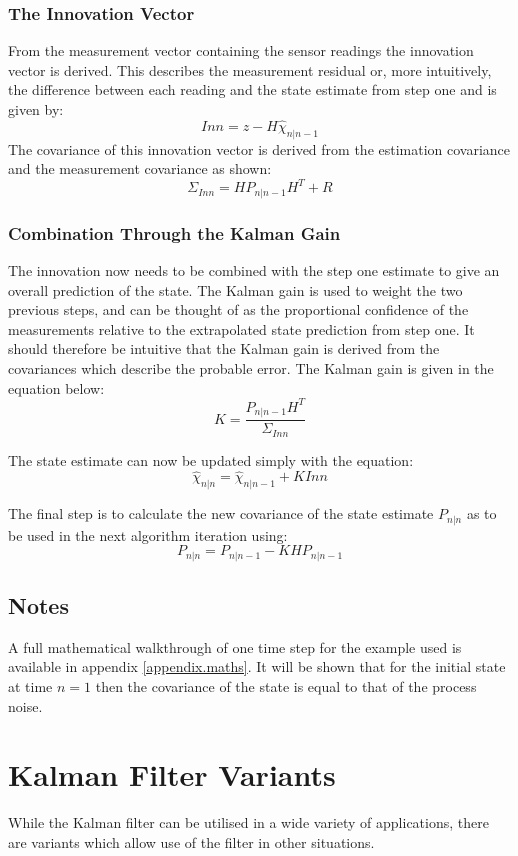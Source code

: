\documentclass[12pt]{article}
\begin{document}
\subsubsection{The Innovation Vector}
	From the measurement vector containing the sensor readings the innovation vector is derived. This describes the measurement residual or, more intuitively, the difference between each reading and the state estimate from step one and is given by:
  \[Inn 
  =
  z - H\hat{\chi}_{n|n-1}\]
  The covariance of this innovation vector is derived from the estimation covariance and the measurement covariance as shown:
\[\Sigma_{Inn}
=
H P_{n|n-1} H^T + R\]

\subsubsection{Combination Through the Kalman Gain}
The innovation now needs to be combined with the step one estimate to give an overall prediction of the state. The Kalman gain is used to weight the two previous steps, and can be thought of as the proportional confidence of the measurements relative to the extrapolated state prediction from step one. It should therefore be intuitive that the Kalman gain is derived from the covariances which describe the probable error. The Kalman gain is given in the equation below:
\[K
=
\frac{P_{n|n-1} H^T}{\Sigma_{Inn}}\]

The state estimate can now be updated simply with the equation:
\[\hat{\chi}_{n|n}
=
\hat{\chi}_{n|n-1} + KInn\]

The final step is to calculate the new covariance of the state estimate \(P_{n|n}\) as to be used in the next algorithm iteration using:
\[P_{n|n}
=
P_{n|n-1} - K H P_{n|n-1}\]

\subsection{Notes}
A full mathematical walkthrough of one time step for the example used is available in appendix \ref{appendix.maths}. It will be shown that for the initial state at time \(n=1\) then the covariance of the state is equal to that of the process noise.


\section{Kalman Filter Variants}
While the Kalman filter can be utilised in a wide variety of applications, there are variants which allow use of the filter in other situations.
\end{document}
